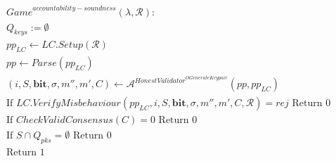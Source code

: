 \begin{align*}
& \mathit{Game}^{\mathit{accountability-soundness}}(\lambda, \mathcal{R}): \\
&  Q_{\mathit{keys}} := \emptyset  \\ 
& \mathit{pp_{\mathit{LC}}} \leftarrow \mathit{LC.Setup}( \mathcal{R}) \\
& \mathit{pp} \leftarrow \mathit{Parse}(\mathit{pp_{\mathit{LC}}}) \\
&  (i, S, \mathbf{bit}, \sigma, m'', m', C) \leftarrow \mathcal{A}^{\mathit{HonestValidator}^{\mathit{OGenerateKeypair}} \mathit{}}(\mathit{pp,pp_{LC}})   \\
& \text{If } \mathit{LC.VerifyMisbehaviour}(\mathit{pp_{\mathit{LC}}}, i, S, \mathbf{bit}, \sigma, m'', m', C, \mathcal{R}) = \mathit{rej} \text{ Return } 0 \\ 
&  \text{If } \mathit{CheckValidConsensus}(C) =0 \text{ Return } 0 \\
& \text{If } S \cap Q_{pks}=\emptyset \text{ Return } 0 \\
& \text{Return } 1
\end{align*}

